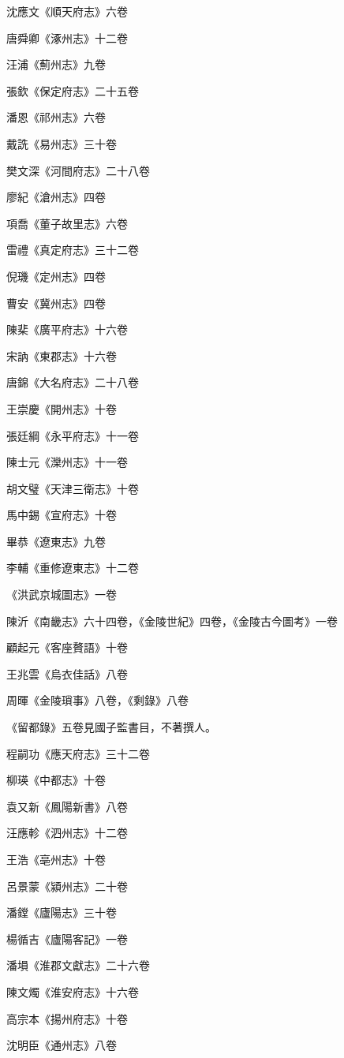 沈應文《順天府志》六卷

唐舜卿《涿州志》十二卷

汪浦《薊州志》九卷

張欽《保定府志》二十五卷

潘恩《祁州志》六卷

戴詵《易州志》三十卷

樊文深《河間府志》二十八卷

廖紀《滄州志》四卷

項喬《董子故里志》六卷

雷禮《真定府志》三十二卷

倪璣《定州志》四卷

曹安《冀州志》四卷

陳棐《廣平府志》十六卷

宋訥《東郡志》十六卷

唐錦《大名府志》二十八卷

王崇慶《開州志》十卷

張廷綱《永平府志》十一卷

陳士元《灤州志》十一卷

胡文璧《天津三衛志》十卷

馬中錫《宣府志》十卷

畢恭《遼東志》九卷

李輔《重修遼東志》十二卷

《洪武京城圖志》一卷

陳沂《南畿志》六十四卷，《金陵世紀》四卷，《金陵古今圖考》一卷

顧起元《客座贅語》十卷

王兆雲《烏衣佳話》八卷

周暉《金陵瑣事》八卷，《剩錄》八卷

《留都錄》五卷見國子監書目，不著撰人。

程嗣功《應天府志》三十二卷

柳瑛《中都志》十卷

袁又新《鳳陽新書》八卷

汪應軫《泗州志》十二卷

王浩《亳州志》十卷

呂景蒙《潁州志》二十卷

潘鏜《廬陽志》三十卷

楊循吉《廬陽客記》一卷

潘塤《淮郡文獻志》二十六卷

陳文燭《淮安府志》十六卷

高宗本《揚州府志》十卷

沈明臣《通州志》八卷

